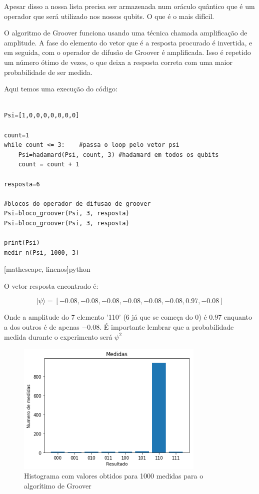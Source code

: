 \documentclass[12pt,a4paper]{article}
\begin{document}
Apesar disso a nossa lista precisa ser armazenada num oráculo quântico que é um operador que será utilizado nos nossos qubits. O que é o mais difícil.


O algoritmo de Groover funciona usando uma técnica chamada amplificação de amplitude. A fase do elemento do vetor que é a resposta procurado é invertida, e em seguida, com o operador de difusão de Groover é amplificada. Isso é repetido um número ótimo de vezes, o que deixa a resposta correta com uma maior probabilidade de ser medida.

Aqui temos uma execução do código:
\begin{verbatim}

Psi=[1,0,0,0,0,0,0,0]

count=1
while count <= 3:    #passa o loop pelo vetor psi
    Psi=hadamard(Psi, count, 3) #hadamard em todos os qubits
    count = count + 1

resposta=6

#blocos do operador de difusao de groover
Psi=bloco_groover(Psi, 3, resposta)
Psi=bloco_groover(Psi, 3, resposta)

print(Psi)
medir_n(Psi, 1000, 3)
\end{verbatim}[mathescape, linenos]{python}

O vetor resposta encontrado é:


$$|\psi\rangle= [-0.08, -0.08, -0.08, -0.08, -0.08, -0.08, 0.97, -0.08]$$

Onde a amplitude do 7 elemento '110' (6  já que se começa do 0) é $0.97$ enquanto a dos outros é de apenas $-0.08$. É importante lembrar que a probabilidade medida durante o experimento será \(\psi^2\)



\begin{figure}
    \centering
    \includegraphics[width=0.8\textwidth]{relatorio_groover.png}
    \caption{Histograma com valores obtidos para 1000 medidas para o algorítimo de Groover }
    \label{fig:Groover}
\end{figure}
\end{document}

